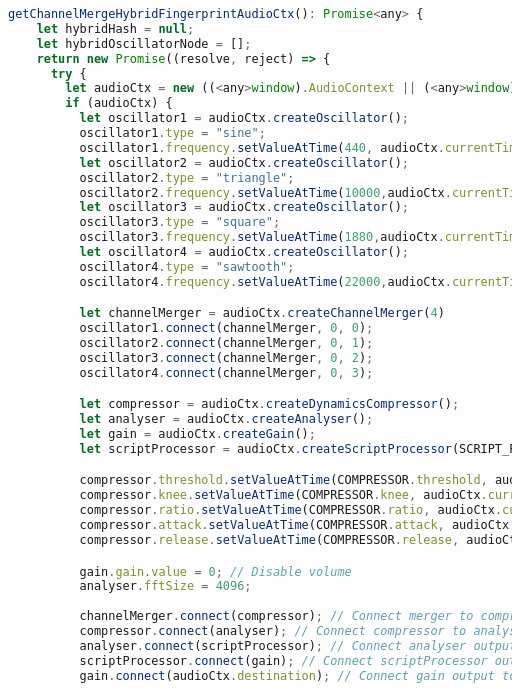 \begin{lstlisting}[language=JavaScript, caption=Channel Merge Hybrid fingerprint generation code, label=channelMergeHybridFingerprintGenerationCode]
  getChannelMergeHybridFingerprintAudioCtx(): Promise<any> {
    let hybridHash = null;
    let hybridOscillatorNode = [];
    return new Promise((resolve, reject) => {
      try {
        let audioCtx = new ((<any>window).AudioContext || (<any>window).webkitAudioContext)();
        if (audioCtx) {
          let oscillator1 = audioCtx.createOscillator();
          oscillator1.type = "sine";
          oscillator1.frequency.setValueAtTime(440, audioCtx.currentTime);
          let oscillator2 = audioCtx.createOscillator();
          oscillator2.type = "triangle";
          oscillator2.frequency.setValueAtTime(10000,audioCtx.currentTime);
          let oscillator3 = audioCtx.createOscillator();
          oscillator3.type = "square";
          oscillator3.frequency.setValueAtTime(1880,audioCtx.currentTime);
          let oscillator4 = audioCtx.createOscillator();
          oscillator4.type = "sawtooth";
          oscillator4.frequency.setValueAtTime(22000,audioCtx.currentTime);

          let channelMerger = audioCtx.createChannelMerger(4)
          oscillator1.connect(channelMerger, 0, 0);
          oscillator2.connect(channelMerger, 0, 1);
          oscillator3.connect(channelMerger, 0, 2);
          oscillator4.connect(channelMerger, 0, 3);

          let compressor = audioCtx.createDynamicsCompressor();
          let analyser = audioCtx.createAnalyser();
          let gain = audioCtx.createGain();
          let scriptProcessor = audioCtx.createScriptProcessor(SCRIPT_PROCESSOR.bufferSize, SCRIPT_PROCESSOR.numberOfInputChannels, SCRIPT_PROCESSOR.numberOfOutputChannels);

          compressor.threshold.setValueAtTime(COMPRESSOR.threshold, audioCtx.currentTime);
          compressor.knee.setValueAtTime(COMPRESSOR.knee, audioCtx.currentTime);
          compressor.ratio.setValueAtTime(COMPRESSOR.ratio, audioCtx.currentTime);
          compressor.attack.setValueAtTime(COMPRESSOR.attack, audioCtx.currentTime);
          compressor.release.setValueAtTime(COMPRESSOR.release, audioCtx.currentTime);

          gain.gain.value = 0; // Disable volume
          analyser.fftSize = 4096;
          
          channelMerger.connect(compressor); // Connect merger to compressor
          compressor.connect(analyser); // Connect compressor to analyser
          analyser.connect(scriptProcessor); // Connect analyser output to scriptProcessor input
          scriptProcessor.connect(gain); // Connect scriptProcessor output to gain input
          gain.connect(audioCtx.destination); // Connect gain output to audiocontext destination
    

\end{lstlisting}
